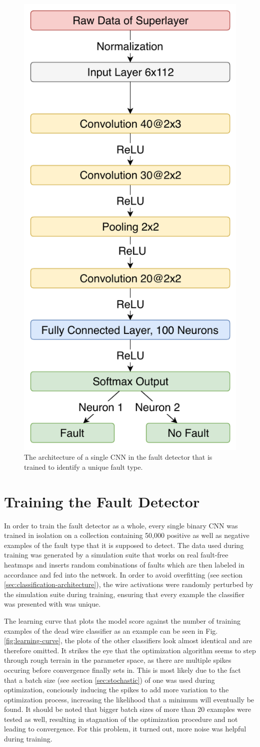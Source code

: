 \begin{figure}[h]
  \centering
  \includegraphics[width=.4\textwidth]{../figures/fault_architecture}
  \caption{The architecture of a single CNN in the fault detector that
  is trained to identify a unique fault type.}
  \label{fig:fault-architecture}
\end{figure}

\section{Training the Fault Detector}

In order to train the fault detector as a whole, every single binary
CNN was trained in isolation on a collection containing 50,000 positive
as well as negative examples of the fault type that it is supposed to
detect. The data used during training was
generated by a simulation suite that works on real fault-free heatmaps
and inserts random combinations of faults which are then labeled in
accordance and fed into the network. In order to avoid overfitting
(see section \ref{sec:classification-architecture}), the wire activations
were randomly perturbed by the simulation suite during training,
ensuring that every example the classifier was presented with was
unique.

The learning curve that plots the model score against the
number of training examples of the dead wire classifier as an example
can be seen in Fig. \ref{fig:learning-curve}, the plots of the other
classifiers look almost identical and are therefore omitted. It
strikes the eye that the optimization algorithm seems to step through
rough terrain in the parameter space, as there are multiple spikes
occuring before convergence finally sets in. This is most likely due
to the fact that a batch size (see section \ref{sec:stochastic}) of
one was used during optimization, conciously inducing the spikes to
add more variation to the optimization process, increasing
the likelihood that a minimum will eventually be found. It should be
noted that bigger batch sizes of more than 20 examples were tested as
well, resulting in stagnation of the optimization procedure and not
leading to convergence. For this problem, it turned out, more noise
was helpful during training.

